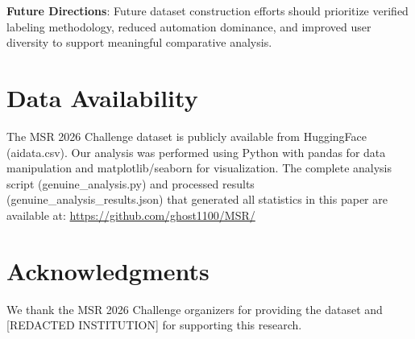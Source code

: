 \documentclass[conference]{IEEEtran}
\begin{document}
\textbf{Future Directions}: Future dataset construction efforts should prioritize verified labeling methodology, reduced automation dominance, and improved user diversity to support meaningful comparative analysis.

\section*{Data Availability}

The MSR 2026 Challenge dataset is publicly available from HuggingFace (aidata.csv). Our analysis was performed using Python with pandas for data manipulation and matplotlib/seaborn for visualization. The complete analysis script (genuine\_analysis.py) and processed results (genuine\_analysis\_results.json) that generated all statistics in this paper are available at: \url{https://github.com/ghost1100/MSR/}

\section*{Acknowledgments}

We thank the MSR 2026 Challenge organizers for providing the dataset and [REDACTED INSTITUTION] for supporting this research.
\end{document}
